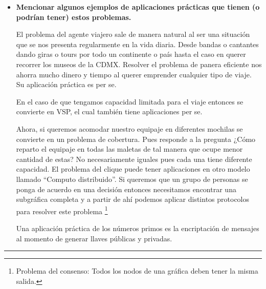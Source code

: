 \documentclass[12pt,letterpaper]{article}
\newcommand{\lineaxd}{{\color{brown}\rule{\linewidth}{0.5mm}}}
\begin{document}
\begin{itemize}
    \item \textbf{Mencionar algunos ejemplos de aplicaciones prácticas que tienen (o podrían tener) estos problemas.}
    
    El problema del agente viajero sale de manera natural al ser una situación que se nos presenta regularmente en la vida diaria. Desde bandas o cantantes dando giras o tours por todo un continente o país hasta el caso en querer recorrer los museos de la CDMX. Resolver el problema de panera eficiente nos ahorra mucho dinero y tiempo al querer emprender cualquier tipo de viaje. Su aplicación práctica es per se.
    
    En el caso de que tengamos capacidad limitada para el viaje entonces se convierte en VSP, el cual también tiene aplicaciones per se.
    
    Ahora, si queremos acomodar nuestro equipaje en diferentes mochilas se convierte en un problema de cobertura. Pues responde a la pregunta ¿Cómo reparto el equipaje en todas las maletas de tal manera que ocupe menor cantidad de estas? No necesariamente iguales pues cada una tiene diferente capacidad.
    \newpage
    El problema del clique puede tener aplicaciones en otro modelo llamado ``Computo distribuido''. Si queremos que un grupo de personas se ponga de acuerdo en una decisión entonces necesitamos encontrar una subgráfica completa y a partir de ahí podemos aplicar distintos protocolos para resolver este problema \footnote{Problema del consenso: Todos los nodos de una gráfica deben tener la misma salida.}
    
    Una aplicación práctica de los números primos es la encriptación de mensajes al momento de generar llaves públicas y privadas.
\end{itemize}

\lineaxd
\end{document}
